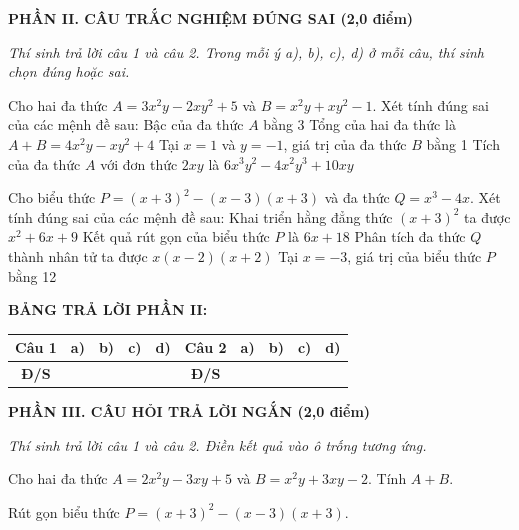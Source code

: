 \documentclass[12pt,a4paper]{article}
\begin{document}
\setcounter{ex}{0}
\noindent\textbf{\large PHẦN II. CÂU TRẮC NGHIỆM ĐÚNG SAI (2,0 điểm)}

\textit{Thí sinh trả lời câu 1 và câu 2. Trong mỗi ý a), b), c), d) ở mỗi câu, thí sinh chọn đúng hoặc sai.}

\vspace{1mm}
\begin{ex}
Cho hai đa thức $A = 3x^2y - 2xy^2 + 5$ và $B = x^2y + xy^2 - 1$. Xét tính đúng sai của các mệnh đề sau:
\choiceTF
{\True Bậc của đa thức $A$ bằng 3}
{\True Tổng của hai đa thức là $A + B = 4x^2y - xy^2 + 4$}
{Tại $x = 1$ và $y = -1$, giá trị của đa thức $B$ bằng 1}
{\True Tích của đa thức $A$ với đơn thức $2xy$ là $6x^3y^2 - 4x^2y^3 + 10xy$}
\end{ex}

\begin{ex}
Cho biểu thức $P = (x + 3)^2 - (x - 3)(x + 3)$ và đa thức $Q = x^3 - 4x$. Xét tính đúng sai của các mệnh đề sau:
\choiceTF
{\True Khai triển hằng đẳng thức $(x + 3)^2$ ta được $x^2 + 6x + 9$}
{\True Kết quả rút gọn của biểu thức $P$ là $6x + 18$}
{\True Phân tích đa thức $Q$ thành nhân tử ta được $x(x - 2)(x + 2)$}
{Tại $x = -3$, giá trị của biểu thức $P$ bằng 12}
\end{ex}


\noindent\textbf{BẢNG TRẢ LỜI PHẦN II:}
\begin{center}
\begin{tabular}{|c|c|c|c|c||c|c|c|c|c|}
\hline
\textbf{Câu 1} & \textbf{a)} & \textbf{b)} & \textbf{c)} & \textbf{d)} & \textbf{Câu 2} & \textbf{a)} & \textbf{b)} & \textbf{c)} & \textbf{d)} \\
\hline
\textbf{Đ/S} & \rule{0pt}{0.6cm} & & & & \textbf{Đ/S} & & & & \\
\hline
\end{tabular}
\end{center}
\vspace{2mm}

\setcounter{ex}{0}
\noindent\textbf{\large PHẦN III. CÂU HỎI TRẢ LỜI NGẮN (2,0 điểm)}

\textit{Thí sinh trả lời câu 1 và câu 2. Điền kết quả vào ô trống tương ứng.}

\vspace{1mm}
\begin{ex}
Cho hai đa thức $A = 2x^2y - 3xy + 5$ và $B = x^2y + 3xy - 2$. Tính $A + B$. 
\end{ex}

\begin{ex}
Rút gọn biểu thức $P = (x + 3)^2 - (x - 3)(x + 3)$. 
\end{ex}
\end{document}
